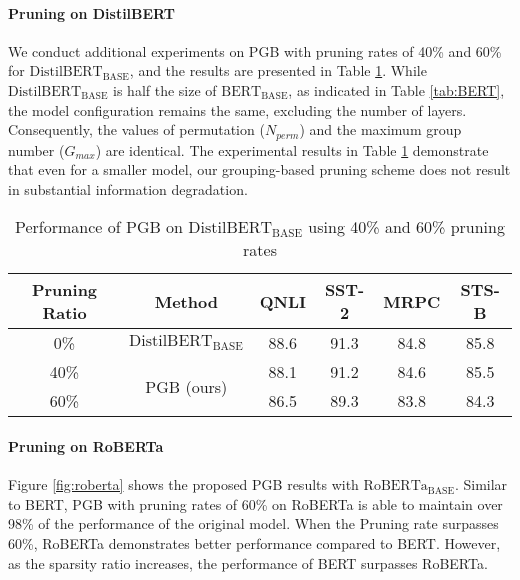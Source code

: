 \paragraph{Pruning on DistilBERT}\label{app:distil}
We conduct additional experiments on PGB with pruning rates of 40\% and 60\% for $\text{DistilBERT}_{\text{BASE}}$, and the results are presented in Table \ref{tab:distil}. While $\text{DistilBERT}_{\text{BASE}}$ is half the size of $\text{BERT}_{\text{BASE}}$, as indicated in Table \ref{tab:BERT}, the model configuration remains the same, excluding the number of layers. Consequently, the values of permutation ($N_{perm}$) and the maximum group number ($G_{max}$) are identical. The experimental results in Table \ref{tab:distil} demonstrate that even for a smaller model, our grouping-based pruning scheme does not result in substantial information degradation.  


\begin{table} [t!]
\begin{tabular}{cccccc}
\noalign{\smallskip}\noalign{\smallskip}\hline

Pruning Ratio & Method & QNLI &SST-2 &MRPC & STS-B   \\ 

\hline \hline
{0\%}& $\text{DistilBERT}_{\text{BASE}}$ & \multirow{1}{*}{88.6} & \multirow{1}{*}{91.3} & \multirow{1}{*}{84.8} &\multirow{1}{*}{85.8} \\

{40\%}  &\multirow{2}{*}{PGB (ours)}     &  \multirow{1}{*}{88.1}  & \multirow{1}{*}{91.2} & \multirow{1}{*}{84.6}  & \multirow{1}{*}{85.5}  \\

{60\%}  &         & \multirow{1}{*}{86.5}  & \multirow{1}{*}{89.3} &\multirow{1}{*}{83.8}& \multirow{1}{*}{84.3}  \\

\hline
\end{tabular}
\centering
\caption{Performance of PGB on $\text{DistilBERT}_{\text{BASE}}$ using 40\% and 60\% pruning rates}
\label{tab:distil}
\end{table}


\paragraph{Pruning on RoBERTa}\label{app:roberta}
Figure \ref{fig:roberta} shows the proposed PGB results with $\text{RoBERTa}_{\text{BASE}}$. Similar to BERT, PGB with pruning rates of 60\% on RoBERTa is able to  maintain over 98\% of the performance of the original model. When the Pruning rate surpasses 60\%, RoBERTa demonstrates better performance compared to BERT. However, as the sparsity ratio increases, the performance of BERT surpasses RoBERTa.


